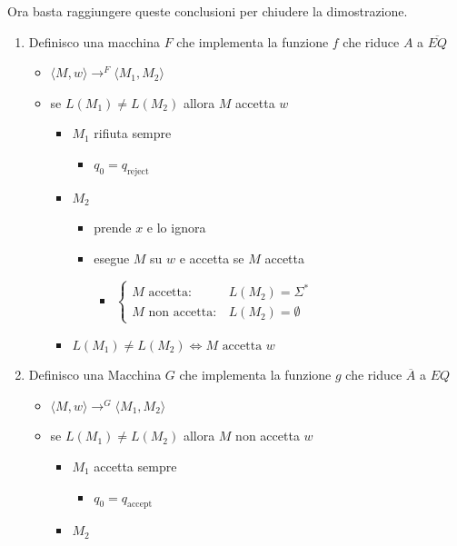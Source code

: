 \documentclass[
                        12pt, %
                        a4paper, %
                        oneside, %
                        headinclude,footinclude, %
                        BCOR5mm, %
                  ]{scrartcl}
\begin{document}
Ora basta raggiungere queste conclusioni per chiudere la dimostrazione.
\begin{enumerate}
\item Definisco una macchina \(F\) che implementa la funzione \(f\) che riduce \(A\) a \(\overline{EQ}\)
\begin{itemize}
\item \(\langle M, w \rangle \rightarrow^{F} \langle M_{1}, M_{2} \rangle\)
\item se \(L(M_{1}) \neq L(M_{2})\) allora \(M\) accetta \(w\)
\begin{itemize}
\item \(M_{1}\) rifiuta sempre
\begin{itemize}
\item \(q_{0} = q_{\text{reject}}\)
\end{itemize}
\item \(M_{2}\)
\begin{itemize}
\item prende \(x\) e lo ignora
\item esegue \(M\) su \(w\) e accetta se \(M\) accetta
\begin{itemize}
\item \(\begin{cases} M \mbox{ accetta}: & L(M_{2})=\Sigma^{*}\\M \mbox{ non accetta}: & L(M_{2}) = \emptyset  \end{cases}\)
\end{itemize}
\end{itemize}
\item \(L(M_{1}) \neq L(M_{2}) \iff M \mbox{ accetta }w\)
\end{itemize}
\end{itemize}
\item Definisco una Macchina \(G\) che implementa la funzione \(g\) che riduce \(\overline A\) a \(EQ\)
\begin{itemize}
\item \(\langle M, w \rangle \rightarrow^{G} \langle M_{1}, M_{2} \rangle\)
\item se \(L(M_{1}) \neq L(M_{2})\) allora \(M\) non accetta \(w\)
\begin{itemize}
\item \(M_{1}\) accetta sempre
\begin{itemize}
\item \(q_{0} = q_{\text{accept}}\)
\end{itemize}
\item \(M_{2}\)
\begin{itemize}

\end{itemize}
\end{itemize}
\end{itemize}
\end{enumerate}
\end{document}
